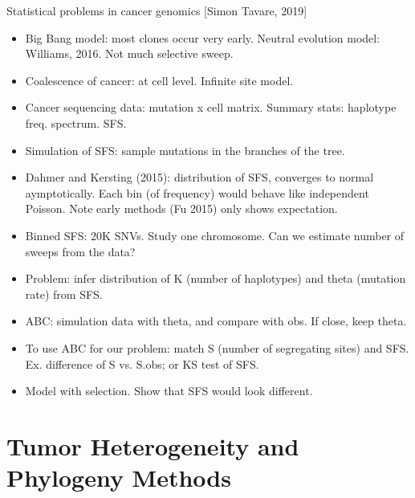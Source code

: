 \documentclass{report}
\begin{document}
Statistical problems in cancer genomics [Simon Tavare, 2019]
\begin{itemize}
	\item Big Bang model: most clones occur very early. Neutral evolution model: Williams, 2016. Not much selective sweep.
	
	\item Coalescence of cancer: at cell level. Infinite site model.
	
	\item Cancer sequencing data: mutation x cell matrix. Summary stats: haplotype freq. spectrum. SFS.
	
	\item Simulation of SFS: sample mutations in the branches of the tree.
	
	\item Dahmer and Kersting (2015): distribution of SFS, converges to normal aymptotically. Each bin (of frequency) would behave like independent Poisson. Note early methods (Fu 2015) only shows expectation.
	
	\item Binned SFS: 20K SNVs. Study one chromosome. Can we estimate number of sweeps from the data?
	
	\item Problem: infer distribution of K (number of haplotypes) and theta (mutation rate) from SFS.
	
	\item ABC: simulation data with theta, and compare with obs. If close, keep theta.
	
	\item To use ABC for our problem: match S (number of segregating sites) and SFS. Ex. difference of S vs. S.obs; or KS test of SFS.
	
	\item Model with selection. Show that SFS would look different.
\end{itemize}
\section{Tumor Heterogeneity and Phylogeny Methods}
\end{document}
